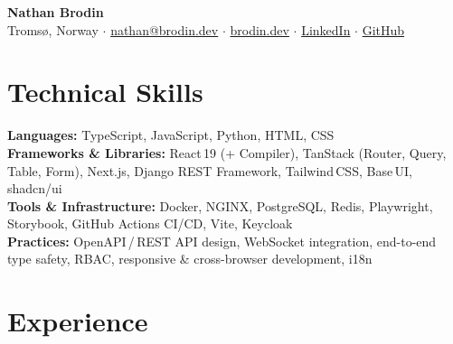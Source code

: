 \documentclass[a4paper,10pt]{article}
\begin{document}
\begin{center}
    {\LARGE\bfseries Nathan Brodin} \\[4pt]
    Tromsø, Norway \enspace$\cdot$\enspace
    \href{mailto:nathan@brodin.dev}{nathan@brodin.dev} \enspace$\cdot$\enspace
    \href{https://brodin.dev}{brodin.dev} \enspace$\cdot$\enspace
    \href{https://linkedin.com/in/nathan-brodin}{LinkedIn} \enspace$\cdot$\enspace
    \href{https://github.com/NathanBrodin}{GitHub}
\end{center}

\vspace{-0.5em}

\section{Technical Skills}

\noindent
\textbf{Languages:} TypeScript, JavaScript, Python, HTML, CSS \\
\textbf{Frameworks \& Libraries:} React\,19 (+ Compiler), TanStack (Router, Query, Table, Form), Next.js, Django REST Framework, Tailwind\,CSS, Base\,UI, shadcn/ui \\
\textbf{Tools \& Infrastructure:} Docker, NGINX, PostgreSQL, Redis, Playwright, Storybook, GitHub Actions CI/CD, Vite, Keycloak \\
\textbf{Practices:} OpenAPI\,/\,REST API design, WebSocket integration, end-to-end type safety, RBAC, responsive \& cross-browser development, i18n

\section{Experience}
\end{document}
